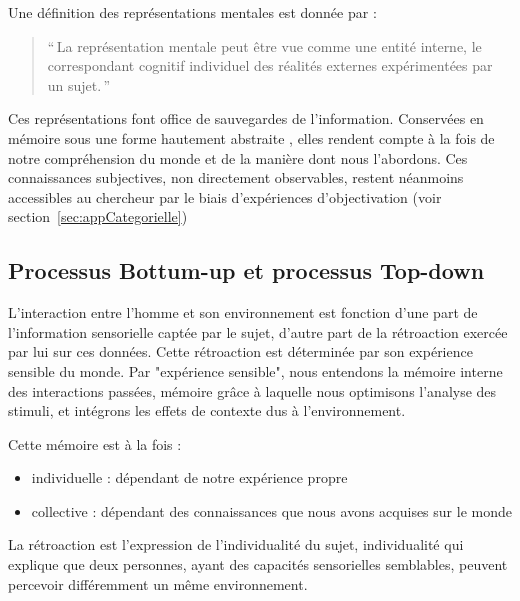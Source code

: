 

Une définition des représentations mentales est donnée par \citep{houde1998vocabulaire}:

\begin{quote}
``\,La représentation mentale peut être vue comme une entité interne, le correspondant cognitif individuel des réalités externes expérimentées par un sujet.\,''
\end{quote}

Ces représentations font office de sauvegardes de l'information. Conservées en mémoire sous une forme hautement abstraite \citep[p. ??]{mcadams1994penser}, elles rendent compte à la fois de notre compréhension du monde et de la manière dont nous l'abordons. Ces connaissances subjectives, non directement observables, restent néanmoins accessibles au chercheur par le biais d'expériences d'objectivation (voir section~\ref{sec:appCategorielle})

\subsection{Processus Bottum-up et processus Top-down}

L'interaction entre l'homme et son environnement est fonction d'une part de l'information sensorielle captée par le sujet, d'autre part de la rétroaction exercée par lui sur ces données. Cette rétroaction est déterminée par son expérience sensible du monde. Par "expérience sensible", nous entendons la mémoire interne des interactions passées, mémoire grâce à laquelle nous optimisons l'analyse des stimuli, et intégrons les effets de contexte dus à l'environnement.

Cette mémoire est à la fois :

\begin{itemize}
\item individuelle : dépendant de notre expérience propre
\item collective : dépendant des connaissances que nous avons acquises sur le monde
\end{itemize}

La rétroaction est l'expression de l'individualité du sujet, individualité qui explique que deux personnes, ayant des capacités sensorielles semblables, peuvent percevoir différemment un même environnement.


